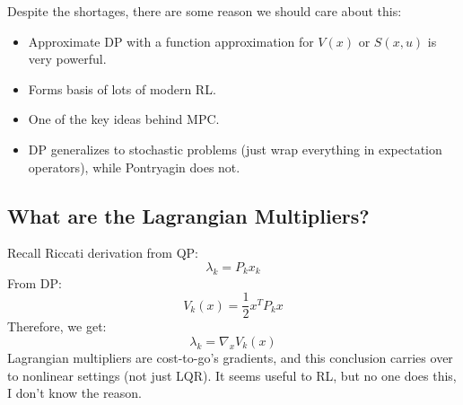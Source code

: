Despite the shortages, there are some reason we should care about this:
\begin{itemize}
    \item Approximate DP with a function approximation for $V(x)$ or $S(x,u)$ is very powerful.
    \item Forms basis of lots of modern RL.
    \item One of the key ideas behind MPC. 
    \item DP generalizes to stochastic problems (just wrap everything in expectation operators), while Pontryagin does not.
\end{itemize} 

\subsection{What are the Lagrangian Multipliers?}
Recall Riccati derivation from QP:
\begin{equation}
    \lambda_k=P_kx_k
\end{equation}
From DP:
\begin{equation}
    V_k(x)=\frac{1}{2}x^TP_kx
\end{equation}
Therefore, we get:
\begin{equation}
    \lambda_k = \nabla_xV_k(x)
\end{equation}
Lagrangian multipliers are cost-to-go's gradients, and this conclusion carries over to nonlinear settings (not just LQR). It seems useful to RL, but no one does this, I don't know the reason.